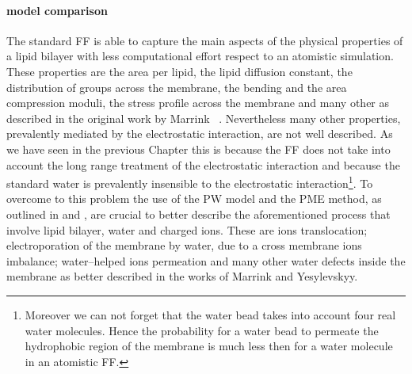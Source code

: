 \paragraph{\textbf{model comparison}} The standard \martini \ac{FF} is able to capture the main aspects of the physical properties of a lipid bilayer with less computational effort respect to an atomistic simulation. These properties are the area per lipid, the lipid diffusion constant, the distribution of groups across the membrane, the bending and the area compression moduli, the stress profile across the membrane and many other as described in the original work by Marrink \etal\, \cite{Martini}. Nevertheless many other properties, prevalently mediated by the electrostatic interaction, are not well described. As we have seen in the previous Chapter this is because the \martini \ac{FF} does not take into account the long range treatment of the electrostatic interaction and because the standard \martini water is prevalently insensible to the electrostatic interaction\footnote{Moreover we can not forget that the \martini water bead takes into account four real water molecules. Hence the probability for a \martini water bead to permeate the hydrophobic region of the membrane is much less then for a water molecule in an atomistic \ac{FF}.}. To overcome to this problem the use of the \ac{PW} model and the \ac{PME} method, as outlined in \cite{MartiniReview} and \cite{PW}, are crucial to better describe the aforementioned process that involve lipid bilayer, water and charged ions. These are ions translocation; electroporation of the membrane by water, due to a cross membrane ions imbalance; water--helped ions permeation and many other water defects inside the membrane as better described in the works of Marrink and Yesylevskyy.

